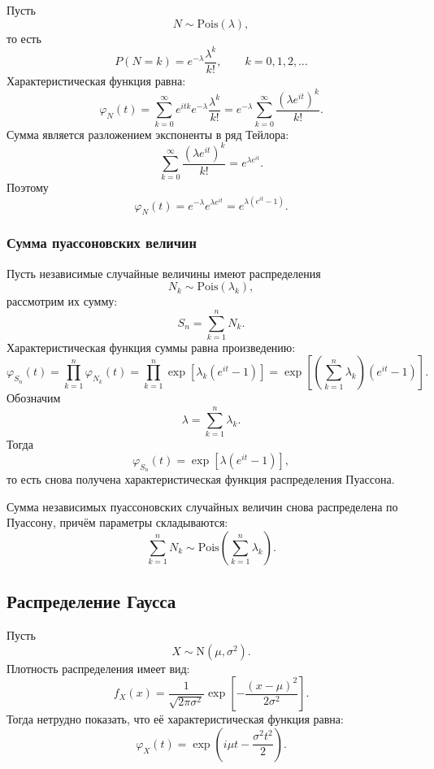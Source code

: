 \documentclass[
  russian,
  12pt,
  a4paper,
  a4paper,
  openany]{scrbook}
\begin{document}
Пусть \[N\sim\mathrm{Pois}(\lambda),\] то есть \[P(N=k)
=
e^{-\lambda}\frac{\lambda^k}{k!},
\qquad
k=0,1,2,\ldots\] Характеристическая функция равна:
\[\varphi_N(t)=\sum_{k=0}^{\infty}e^{itk}e^{-\lambda}\frac{\lambda^k}{k!}=e^{-\lambda}\sum_{k=0}^{\infty}
\frac{(\lambda e^{it})^k}{k!}.\] Сумма является разложением экспоненты в
ряд Тейлора: \[\sum_{k=0}^{\infty}
\frac{(\lambda e^{it})^k}{k!}
=
e^{\lambda e^{it}}.\] Поэтому \[\boxed{\varphi_N(t)=
e^{-\lambda}e^{\lambda e^{it}} =
e^{\lambda\left(e^{it}-1\right)}}.\]

\subsubsection{Сумма пуассоновских
величин}\label{ux441ux443ux43cux43cux430-ux43fux443ux430ux441ux441ux43eux43dux43eux432ux441ux43aux438ux445-ux432ux435ux43bux438ux447ux438ux43d}

Пусть независимые случайные величины имеют распределения
\[N_k\sim\mathrm{Pois}(\lambda_k),\] рассмотрим их сумму:
\[S_n=\sum_{k=1}^{n}N_k.\] Характеристическая функция суммы равна
произведению: \[\varphi_{S_n}(t)=
\prod_{k=1}^{n}\varphi_{N_k}(t)=\prod_{k=1}^{n}\exp\!\left[\lambda_k(e^{it}-1)\right]=
\exp\!\left[\left(\sum_{k=1}^{n}\lambda_k\right)(e^{it}-1)\right].\]
Обозначим \[\lambda=\sum_{k=1}^{n}\lambda_k.\] Тогда \[\varphi_{S_n}(t)
=
\exp\!\left[\lambda(e^{it}-1)\right],\] то есть снова получена
характеристическая функция распределения Пуассона.

\begin{booknote}

Сумма независимых пуассоновских случайных величин снова распределена по
Пуассону, причём параметры складываются: \[\boxed{
\sum_{k=1}^{n}N_k
\sim
\mathrm{Pois}\!\left(\sum_{k=1}^{n}\lambda_k\right).
}\]

\end{booknote}

\subsection{Распределение
Гаусса}\label{ux440ux430ux441ux43fux440ux435ux434ux435ux43bux435ux43dux438ux435-ux433ux430ux443ux441ux441ux430}

Пусть \[X\sim\mathrm{N}(\mu,\sigma^2).\] Плотность распределения имеет
вид: \[f_X(x)
=
\frac{1}{\sqrt{2\pi\sigma^2}}
\exp\!\left[-\frac{(x-\mu)^2}{2\sigma^2}\right].\] Тогда нетрудно
показать, что её характеристическая функция равна: \[\boxed{
\varphi_X(t)
=
\exp\!\left(
i\mu t-\frac{\sigma^2t^2}{2}
\right).
}\]
\end{document}
